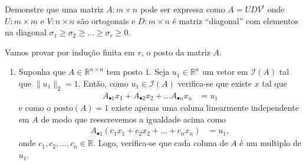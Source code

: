 \documentclass[a4paper,12pt, leqno, answers]{exam}
\newcommand{\mdot}{\bullet}
\begin{document}
\begin{questions}

     Demonstre que uma matriz $A : m \times n$ pode ser expressa como $A = U D V^t$ onde $U : m \times m$ e $V : n \times n$ s\~{a}o ortogonais e $D : m \times n$ \'{e} matriz ``diagonal'' com elementos na diagonal $\sigma_1 \geq \sigma_2 \geq \ldots \geq \sigma_r \geq 0$.
    \begin{solution}
        Vamos provar por indu\c{c}\~{a}o finita em $r$, o posto da matriz $A$.
        \begin{enumerate}
            \item Suponha que $A \in \mathbb{R}^{n \times n}$ tem posto $1$. Seja $u_1 \in \mathbb{R}^n$ um vetor em $\mathcal{I}(A)$ tal que $\| u_1 \|_2 = 1$. Ent\~{a}o, como $u_1 \in \mathcal{I}(A)$ verifica-se que existe $x$ tal que
                \begin{align*}
                    A_{\mdot 1} x_1 + A_{\mdot 2} x_2 + \ldots A_{\mdot n} x_n &= u_1
                \end{align*}
                e como o $\mathrm{posto}(A) = 1$ existe apenas uma coluna linearmente independente em $A$ de modo que reescrevemos a igualdade acima como
                \begin{align*}
                    A_{\mdot 1} \left( c_1 x_1 + c_2 x_2 + \ldots + c_n x_n \right) &= u_1,
                \end{align*}
                onde $c_1, c_2, \ldots, c_n \in \mathbb{R}$. Logo, verifica-se que cada coluna de $A$ \'{e} um multiplo de $u_1$.


\end{enumerate}
\end{solution}
\end{questions}
\end{document}
